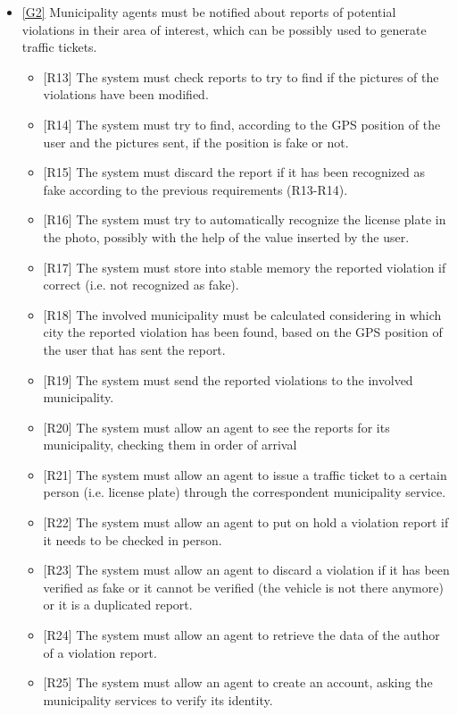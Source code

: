 \documentclass[a4paper]{report}
\begin{document}
\begin{itemize}
\item \hyperref[G2]{[G2]} Municipality agents must be notified about reports of potential violations in their area of interest, which can be possibly used to generate traffic tickets.	
\begin{itemize}
\item {[R13]}	\label{R13}The system must check reports to try to find if the pictures of the violations have been modified.
\item {[R14]}	\label{R14}The system must try to find, according to the GPS position of the user and the pictures sent, if the position is fake or not.
\item {[R15]}	\label{R15}The system must discard the report if it has been recognized as fake according to the previous requirements (R13-R14).
\item {[R16]}	\label{R16}The system must try to automatically recognize the license plate in the photo, possibly with the help of the value inserted by the user.
\item {[R17]}	\label{R17}The system must store into stable memory the reported violation if correct (i.e. not recognized as fake).
\item {[R18]}	\label{R18}The involved municipality must be calculated considering in which city the reported violation has been found, based on the GPS position of the user that has sent the report.
\item {[R19]}	\label{R19}The system must send the reported violations to the involved municipality.
\item {[R20]}   \label{R20}The system must allow an agent to see the reports for its municipality, checking them in order of arrival
\item {[R21]}	\label{R21}The system must allow an agent to issue a traffic ticket to a certain person (i.e. license plate) through the correspondent municipality service.
\item {[R22]}	\label{R22}The system must allow an agent to put on hold a violation report if it needs to be checked in person.
\item {[R23]}	\label{R23}\label{R20}The system must allow an agent to discard a violation if it has been verified as fake or it cannot be verified (the vehicle is not there anymore) or it is a duplicated report.
\item {[R24]}	\label{R24}The system must allow an agent to retrieve the data of the author of a violation report.
\item {[R25]}	\label{R25}The system must allow an agent to create an account, asking the municipality services to verify its identity.

\end{itemize}
\end{itemize}
\end{document}

